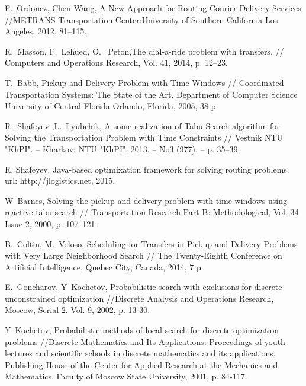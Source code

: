 \documentclass[]{TAACpaper}
\begin{document}
\begin{thebibliography}{99}

 F.~Ordonez, Chen Wang, A New Approach for Routing Courier Delivery Services //METRANS Transportation Center:University of Southern California
Los Angeles,  2012, 81--115.

 R.~Masson, F.~Lehued, O.~ Peton,The dial-a-ride problem with transfers. // Computers and Operations Research, Vol. 41, 2014, p. 12--23.

 T.~Babb, Pickup and Delivery Problem with Time Windows // Coordinated Transportation Systems: The State of the Art. Department of Computer Science University of Central Florida Orlando, Florida, 2005, 38 p.

 R.~Shafeyev ,L.~Lyubchik, A some realization of Tabu Search algorithm for Solving the Transportation Problem with Time Constraints // Vestnik NTU "KhPI". – Kharkov: NTU
"KhPI", 2013. – No3 (977). – p. 35–39.

  R. Shafeyev. Java-based optimixation framework for solving routing problems.\\ url: http://jlogistics.net, 2015.

 W~Barnes, Solving the pickup and delivery problem with time windows using reactive tabu search // Transportation Research Part B: Methodological, Vol. 34 Issue 2, 2000, p. 107--121.

 B.~Coltin, M.~Veloso, Scheduling for Transfers in Pickup and Delivery Problems with Very Large Neighborhood Search // The Twenty-Eighth Conference on Artificial Intelligence, Quebec City, Canada, 2014, 7 p.

 E.~Goncharov, Y~Kochetov, Probabilistic search with exclusions for discrete unconstrained optimization  //Discrete Analysis and Operations Research, Moscow, Serial 2. Vol. 9, 2002, p. 13-30.

   Y~Kochetov, Probabilistic methods of local search for discrete optimization problems //Discrete Mathematics and Its Applications: Proceedings of youth lectures and scientific schools in discrete mathematics and its applications, Publishing House of the Center for Applied Research at the Mechanics and Mathematics. Faculty of Moscow State University, 2001, p. 84-117.  


\end{thebibliography}
\end{document}
